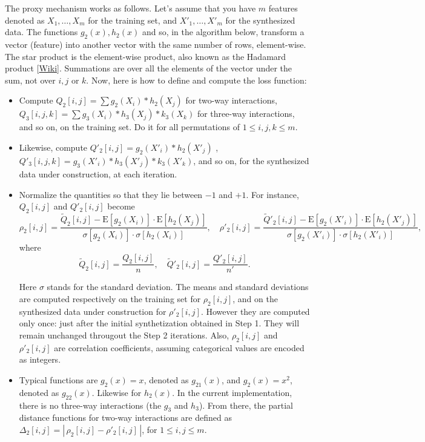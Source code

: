 \documentclass[oneside,10pt]{book}
\begin{document}
The proxy mechanism works as follows. Let's assume that you have $m$ features denoted as $X_1,\dots, X_m$ for the training set,
 and $X'_1,\dots, X'_m$ for the synthesized data. The functions $g_2(x), h_2(x)$ and so, in the algorithm below,  transform a vector (feature) into another vector with the same number of rows, element-wise. The star product is the element-wise product, also known as the 
\textcolor{index}{Hadamard product} [\href{https://en.wikipedia.org/wiki/Hadamard_product_(matrices)}{Wiki}].  Summations are over all the elements of the vector under the sum, not over $i,j$ or $k$. Now, here is how to define and compute the loss function:
\vspace{1ex}
\begin{itemize}
\item Compute 
  $Q_2[i,j] = \sum g_2(X_i) * h_2(X_j)$ for two-way interactions,  $Q_3[i,j,k] = \sum g_3(X_i)* h_3(X_j) * k_3(X_k)$ for three-way interactions, and so on, on the training set. Do it for all permutations of $1\leq i, j, k\leq m$.
\item Likewise, compute  $Q'_2[i,j] = g_2(X'_i) * h_2(X'_j)$ , $Q'_3[i,j,k] = g_3(X'_i) * h_3(X'_j) * k_3(X'_k)$, and so on, for the synthesized data under construction, at each iteration. 
\item Normalize the quantities so that they lie between $-1$ and $+1$. For instance, $Q_2[i,j]$ and $Q'_2[i,j]$ become
$$\rho_2[i, j] = \frac{\widetilde{Q}_2[i,j] - \text{E}[g_2(X_i)]\cdot \text{E}[h_2(X_j)]}{\sigma[g_2(X_i)] \cdot \sigma[h_2(X_i)]},\quad
\rho'_2[i, j] = \frac{\widetilde{Q}'_2[i, j] - \text{E}[g_2(X'_i)]\cdot \text{E}[h_2(X'_j)]}{\sigma[g_2(X'_i)] \cdot \sigma[h_2(X'_i)]},$$
where $$\widetilde{Q}_2[i, j] = \frac{Q_2[i, j]}{n}, \quad \widetilde{Q}'_2[i, j] = \frac{Q'_2[i, j]}{n'}.$$

\noindent Here $\sigma$ stands for the standard deviation. The means and standard deviations are computed respectively on the training set for $\rho_2[i,j]$, and on the synthesized data under construction for $\rho'_2[i,j]$. However they are computed only once: just after the initial synthetization obtained in Step 1. They will remain unchanged througout the Step 2 iterations. Also, $\rho_2[i,j]$ and $\rho'_2[i,j]$ are correlation coefficients, assuming categorical values are encoded as integers.
\item Typical functions are $g_2(x) = x$, denoted as $g_{21}(x)$, and $g_2(x) = x^2$, denoted as $g_{22}(x)$. Likewise for $h_2(x)$. In the current implementation, 
 there is no three-way interactions (the $g_3$ and $h_3$). 
From there, the partial distance functions for two-way interactions are defined as $\Delta_2[i,j] = |\,\rho_2[i, j] - \rho'_2[i, j]\,|$, for $1\leq i, j\leq m$.
 

\end{itemize}
\end{document}
